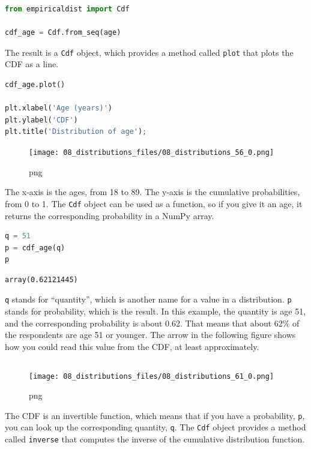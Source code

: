 \documentclass[
]{book}
\newcommand{\passthrough}[1]{#1}
\begin{document}
\begin{lstlisting}[language=Python]
from empiricaldist import Cdf

cdf_age = Cdf.from_seq(age)
\end{lstlisting}

The result is a \passthrough{\lstinline!Cdf!} object, which provides a
method called \passthrough{\lstinline!plot!} that plots the CDF as a
line.

\begin{lstlisting}[language=Python]
cdf_age.plot()

plt.xlabel('Age (years)')
plt.ylabel('CDF')
plt.title('Distribution of age');
\end{lstlisting}

\begin{figure}
\centering
\texttt{[image: 08\_distributions\_files/08\_distributions\_56\_0.png]}
\caption{png}
\end{figure}

The x-axis is the ages, from 18 to 89. The y-axis is the cumulative
probabilities, from 0 to 1. The \passthrough{\lstinline!Cdf!} object can
be used as a function, so if you give it an age, it returns the
corresponding probability in a NumPy array.

\begin{lstlisting}[language=Python]
q = 51
p = cdf_age(q)
p
\end{lstlisting}

\begin{lstlisting}
array(0.62121445)
\end{lstlisting}

\passthrough{\lstinline!q!} stands for ``quantity'', which is another
name for a value in a distribution. \passthrough{\lstinline!p!} stands
for probability, which is the result. In this example, the quantity is
age 51, and the corresponding probability is about 0.62. That means that
about 62\% of the respondents are age 51 or younger. The arrow in the
following figure shows how you could read this value from the CDF, at
least approximately.

\begin{lstlisting}[language=Python]
\end{lstlisting}

\begin{figure}
\centering
\texttt{[image: 08\_distributions\_files/08\_distributions\_61\_0.png]}
\caption{png}
\end{figure}

The CDF is an invertible function, which means that if you have a
probability, \passthrough{\lstinline!p!}, you can look up the
corresponding quantity, \passthrough{\lstinline!q!}. The
\passthrough{\lstinline!Cdf!} object provides a method called
\passthrough{\lstinline!inverse!} that computes the inverse of the
cumulative distribution function.
\end{document}
